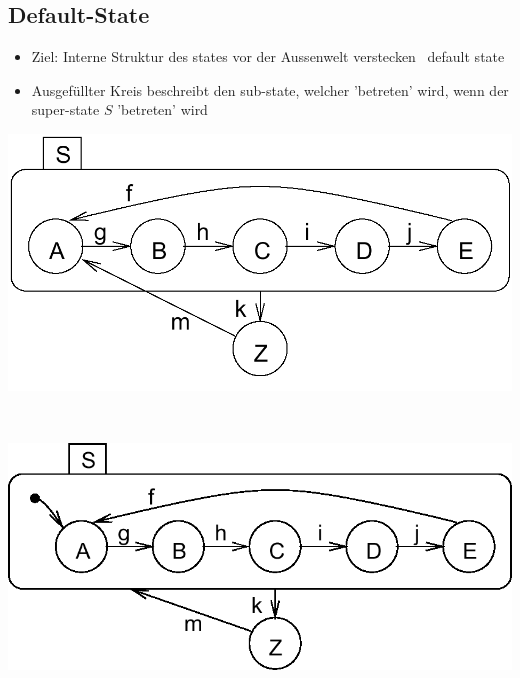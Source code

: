 
\subsection{Default-State}

\begin{itemize}
    \item Ziel: Interne Struktur des states vor der Aussenwelt verstecken \textrightarrow\ default state
    \item Ausgefüllter Kreis beschreibt den sub-state, welcher 'betreten' wird, wenn der super-state $S$ 'betreten' wird %
\end{itemize}

\vspace{0.2cm}

\begin{minipage}[c]{0.41\columnwidth}
    \includegraphics[width=\columnwidth]{images/statechart_hierarchie.png}
\end{minipage}
\hfill
\begin{minipage}[c]{0.05\columnwidth}
    \begin{center}
        \huge \textrightarrow\
    \end{center}
\end{minipage}
\hfill
\begin{minipage}[c]{0.41\columnwidth}
    \includegraphics[width=\columnwidth]{images/statechart_default_state.png}
\end{minipage}


